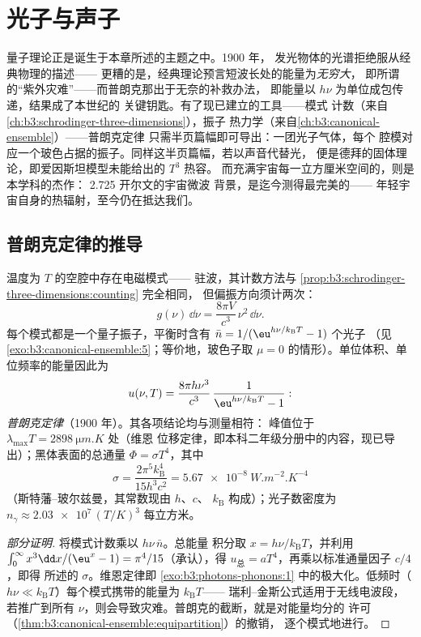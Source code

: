 \chapter{光子与声子}\label{ch:b3:photons-phonons}

量子理论正是诞生于本章所述的主题之中。1900 年，
发光物体的光谱拒绝服从经典物理的描述——
更糟的是，经典理论预言短波长处的能量为\emph{无穷大}，
即所谓的“紫外灾难”——而普朗克那出于无奈的补救办法，
即能量以 $h\nu$ 为单位成包传递，结果成了本世纪的
关键钥匙。有了现已建立的工具——模式
计数（来自\cref{ch:b3:schrodinger-three-dimensions}），振子
热力学（来自\cref{ch:b3:canonical-ensemble}）——普朗克定律
只需半页篇幅即可导出：一团光子气体，每个
腔模对应一个玻色占据的振子。同样这半页篇幅，若以声音代替光，
便是德拜的固体理论，即爱因斯坦模型未能给出的 $T^3$ 热容。
而充满宇宙每一立方厘米空间的，则是本学科的杰作：
2.725 开尔文的宇宙微波
背景，是迄今测得最完美的——
年轻宇宙自身的热辐射，至今仍在抵达我们。

\section{普朗克定律的推导}

\begin{theorem}[黑体辐射谱]\label{thm:b3:photons-phonons:planck}
温度为 $T$ 的空腔中存在电磁模式——
驻波，其计数方法与
\cref{prop:b3:schrodinger-three-dimensions:counting} 完全相同，
但偏振方向须计两次：
\[
g(\nu)\,\dd\nu = \frac{8\pi V}{c^3}\,\nu^2\,\dd\nu .
\]
每个模式都是一个量子振子，平衡时含有
$\bar n = 1/(\eu^{h\nu/k_{\text{B}}T} - 1)$ 个光子
（见\cref{exo:b3:canonical-ensemble:5}；等价地，玻色子取 $\mu =
0$ 的情形）。单位体积、单位频率的能量因此为
\[
u(\nu, T) = \frac{8\pi h\nu^3}{c^3}\,
\frac{1}{\eu^{h\nu/k_{\text{B}}T} - 1} :
\]
\emph{普朗克定律}（1900 年）。其各项结论均与测量相符：
峰值位于 $\lambda_{\max}T = \qty{2898}{\micro m.K}$ 处（维恩
位移定律，即本科二年级分册中的内容，现已导出）；黑体表面的总通量
$\Phi = \sigma T^4$，其中
\[
\sigma = \frac{2\pi^5k_{\text{B}}^4}{15h^3c^2}
 = \qty{5.67e-8}{W.m^{-2}.K^{-4}}
\]
（斯特藩–玻尔兹曼，其常数现由 $h$、$c$、
$k_{\text{B}}$ 构成）；光子数密度为 $n_\gamma \approx
\num{2.03e7}\,(T/\unit{K})^3$ 每立方米。
\end{theorem}

\begin{proof}[部分证明]
将模式计数乘以 $h\nu\,\bar n$。总能量
积分取 $x = h\nu/k_{\text{B}}T$，并利用 $\int_0^\infty
x^3\dd x/(\eu^x - 1) = \pi^4/15$（承认），得 $u_{\text{总}}
= aT^4$，再乘以标准通量因子 $c/4$，即得
所述的 $\sigma$。维恩定律即
\cref{exo:b3:photons-phonons:1} 中的极大化。低频时（$h\nu \ll
k_{\text{B}}T$）每个模式携带的能量为 $k_{\text{B}}T$——
瑞利–金斯公式适用于无线电波段，若推广到所有
$\nu$，则会导致灾难。普朗克的截断，就是对能量均分的
许可（\cref{thm:b3:canonical-ensemble:equipartition}）的撤销，
逐个模式地进行。
\end{proof}

